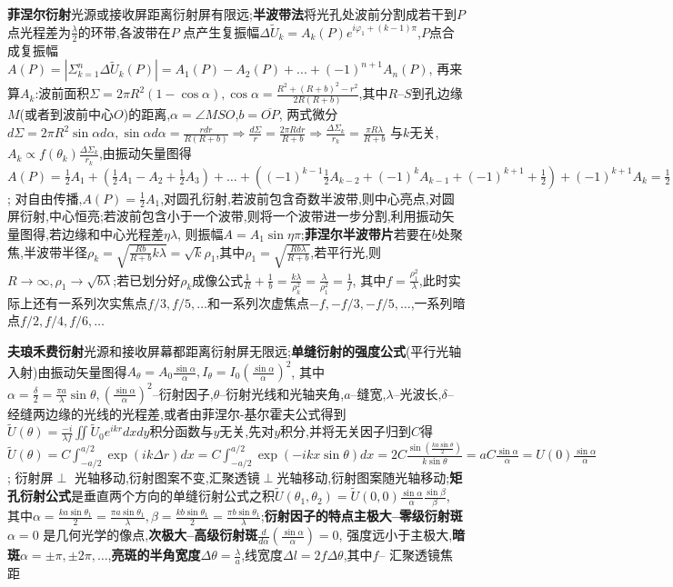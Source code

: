 \documentclass[10pt,a4paper]{article}
\begin{document}
\textbf{菲涅尔衍射}光源或接收屏距离衍射屏有限远;\textbf{半波带法}将光孔处波前分割成若干到$P$点光程差为$\frac{\lambda}{2}$的环带,各波带在$P$ 点产生复振幅$\Delta\widetilde{U}_k=A_k(P)e^{i\varphi_1+(k-1)\pi}$,$P$点合成复振幅$A(P)=|\Sigma_{k=1}^n\Delta\widetilde{U}_k(P)|=A_1(P)-A_2(P)+...+(-1)^{n+1}A_n(P)$, 再来算$A_k$:波前面积$\Sigma=2\pi R^2(1-\cos\alpha),\cos\alpha=\frac{R^2+(R+b)^2-r^2}{2R(R+b)}$,其中$R$--$S$到孔边缘$M$(或者到波前中心$O$)的距离,$\alpha=\angle MSO$,$b=\overline{OP}$, 两式微分$d\Sigma=2\pi R^2\sin\alpha d\alpha,\sin\alpha d\alpha=\frac{rdr}{R(R+b)}\Longrightarrow\frac{d\Sigma}{r}=\frac{2\pi Rdr}{R+b}\Longrightarrow\frac{\Delta\Sigma_k}{r_k}=\frac{\pi R\lambda}{R+b}$ 与$k$无关,$A_k\propto f(\theta_k)\frac{\Delta\Sigma_k}{r_k}$,由振动矢量图得$A(P)=\frac{1}{2}A_1+(\frac{1}{2}A_1-A_2+\frac{1}{2}A_3)+\ldots+((-1)^{k-1}\frac{1}{2}A_{k-2}+(-1)^kA_{k-1}+(-1)^{k+1}+\frac{1}{2})+(-1)^{k+1}A_k=\frac{1}{2}[A_1+(-1)^{n+1}A_n]$; 对自由传播,$A(P)=\frac{1}{2}A_1$,对圆孔衍射,若波前包含奇数半波带,则中心亮点,对圆屏衍射,中心恒亮;若波前包含小于一个波带,则将一个波带进一步分割,利用振动矢量图得,若边缘和中心光程差$\eta\lambda$, 则振幅$A=A_1\sin\eta\pi$;\textbf{菲涅尔半波带片}若要在$b$处聚焦,半波带半径$\rho_k=\sqrt{\frac{Rb}{R+b}k\lambda}=\sqrt{k}\rho_1$,其中$\rho_1=\sqrt{\frac{Rb\lambda}{R+b}}$,若平行光,则$R\to\infty,\rho_1\to\sqrt{b\lambda}$;若已划分好$\rho_k$成像公式$\frac{1}{R}+\frac{1}{b}=\frac{k\lambda}{\rho_k^2}=\frac{\lambda}{\rho_1^2}=\frac{1}{f}$, 其中$f=\frac{\rho_1^2}{\lambda}$,此时实际上还有一系列次实焦点$f/3,f/5,\ldots$和一系列次虚焦点$-f,-f/3,-f/5,\ldots$,一系列暗点$f/2,f/4,f/6,\ldots$

\textbf{夫琅禾费衍射}光源和接收屏幕都距离衍射屏无限远;\textbf{单缝衍射的强度公式}(平行光轴入射)由振动矢量图得$A_{\theta}=A_0\frac{\sin\alpha}{\alpha},I_{\theta}=I_0(\frac{\sin\alpha}{\alpha})^2$, 其中$\alpha=\frac{\delta}{2}=\frac{\pi a}{\lambda}\sin\theta,(\frac{\sin\alpha}{\alpha})^2$--衍射因子,$\theta$--衍射光线和光轴夹角,$a$--缝宽,$\lambda$--光波长,$\delta$--经缝两边缘的光线的光程差,或者由菲涅尔-基尔霍夫公式得到$\widetilde{U}(\theta)=\frac{-i}{\lambda f}\iint\widetilde{U}_0e^{ikr}dxdy$积分函数与$y$无关,先对$y$积分,并将无关因子归到$C$得$\widetilde{U}(\theta)=C\int_{-a/2}^{a/2}\exp(ik\Delta r)dx=C\int_{-a/2}^{a/2}\exp(-ikx\sin\theta)dx=2C\frac{\sin(\frac{ka\sin\theta}{2})}{k\sin\theta}=aC\frac{\sin\alpha}{\alpha}=U(0)\frac{\sin\alpha}{\alpha}$; 衍射屏$\perp$ 光轴移动,衍射图案不变,汇聚透镜$\perp$光轴移动,衍射图案随光轴移动;\textbf{矩孔衍射公式}是垂直两个方向的单缝衍射公式之积$\widetilde{U}(\theta_1,\theta_2)=\widetilde{U}(0,0)\frac{\sin\alpha}{\alpha}\frac{\sin\beta}{\beta}$, 其中$\alpha=\frac{ka\sin\theta_1}{2}=\frac{\pi a\sin\theta_1}{\lambda},\beta=\frac{kb\sin\theta_1}{2}=\frac{\pi b\sin\theta_1}{\lambda}$;\textbf{衍射因子的特点主极大--零级衍射斑}$\alpha=0$ 是几何光学的像点,\textbf{次极大--高级衍射斑}$\frac{d}{d\alpha}(\frac{\sin\alpha}{\alpha})=0$, 强度远小于主极大,\textbf{暗斑}$\alpha=\pm\pi,\pm2\pi,\ldots$,\textbf{亮斑的半角宽度}$\Delta\theta=\frac{\lambda}{a}$,线宽度$\Delta l=2f\Delta\theta$,其中$f$-- 汇聚透镜焦距
\end{document}
